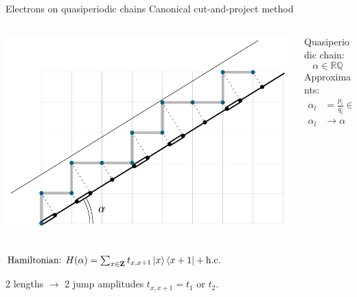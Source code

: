 \documentclass[xcolor=x11names,compress,professionalfonts]{beamer}
\renewcommand{\(}{\begin{columns}}
\renewcommand{\)}{\end{columns}}
\newcommand{\<}[1]{\begin{column}{#1}}
\renewcommand{\>}{\end{column}}
\begin{document}
\begin{frame}{Electrons on quasiperiodic chains}
Canonical cut-and-project method
\begin{columns}
\begin{column}{8.5cm}
	\centering
	\includegraphics[scale=.7]{img/cut_and_project.pdf}
\end{column}

\begin{column}{3cm}
Quasiperiodic chain:
\[
	\alpha \in \mathbb{R} \mathbb{Q}
\]
Approximants:
\begin{align*}
\alpha_l &= \frac{p_l}{q_l} \in \mathbb{Q} \\
\alpha_l &\rightarrow \alpha
\end{align*}
\end{column}
\end{columns}

	$
		\text{Hamiltonian: } H(\alpha) = \sum_{x \in \mathbf{Z}} t_{x,x+1} \ket{x} \bra{x+1} + \text{h.c.}
	$
	
	2 lengths $\to$ 2 jump amplitudes $t_{x,x+1} = t_{1}$ or $t_2$.	
\end{frame}
\end{document}
